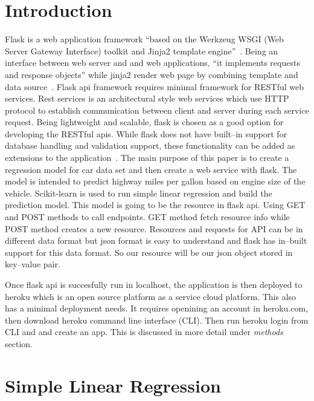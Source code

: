 \section{Introduction}
Flask is a web application framework ``based on the Werkzeug WSGI (Web Server
Gateway Interface) toolkit and Jinja2 template 
engine''~\cite{hid-sp18-415-flask}. Being an interface between web server
and and web applications, ``it implements requests and response objects'' 
while jinja2 render web page by combining template and data 
source~\cite{hid-sp18-415-www-flask}. 
Flask api framework requires minimal framework for RESTful web services.
Rest services is an architectural style web services which use HTTP protocol
to establish communication between client and server during each service
request.
Being lightweight and scalable, flask is chosen as a good option for 
developing the RESTful apis. While flask does not have built--in support for 
database handling and validation support, these functionality can be added as
extensions to the application~\cite{hid-sp18-415-www-flask}.
The main purpose of this paper is
to create a regression model for car data set and then create a web service
with flask. The model is intended to
predict highway miles per gallon based on engine size of the vehicle.
Scikit-learn is used to run simple linear regression and build the prediction
model. This model is going
to be the resource in flask api. Using GET and POST methods to call
endpoints. GET method fetch resource info while POST method creates
a new resource. Resources and requests for API can be in different data
format but json format
is easy to understand and flask has in--built support for this data format. So 
our resource will be our json object stored in key--value pair.
  
Once flask api is succesfully run in localhost, the application is
then deployed to heroku which is an open source platform as a 
service cloud platform. This also has a minimal deployment needs.
It requires openining an account in heroku.com, then download heroku
command line interface (CLI). Then run heroku login from CLI and
and create an app. This is discussed in more detail under \textit{methods} 
section.
  
\section{Simple Linear Regression}

